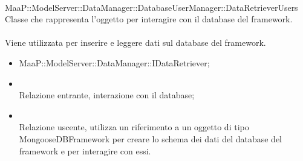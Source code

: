 \\
MaaP::ModelServer::DataManager::DatabaseUserManager::DataRetrieverUsers\\
Classe che rappresenta l'oggetto per interagire con il database del framework.\\
\\
Viene utilizzata per inserire e leggere dati sul database del framework.\\
\begin{itemize}
\item MaaP::ModelServer::DataManager::IDataRetriever;
\end{itemize}
\begin{itemize}
\item{}\\
Relazione entrante, interazione con il database;
\item{}\\
Relazione uscente, utilizza un riferimento a un oggetto di tipo MongooseDBFramework per creare lo schema dei dati del database del framework e per interagire con essi.
\end{itemize}



